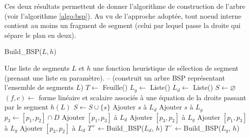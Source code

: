 Ces deux résultats permettent de donner l'algorithme de construction de
l'arbre (voir l'algorithme \ref{algo:bsp}). Au vu de l'approche adoptée,
tout noeud interne contient au moins un fragment de segment (celui
par lequel passe la droite qui sépare le plan en deux).

\begin{algorithm}
  \caption{Build\_BSP($L, h$)}
  \begin{algorithmic}[1] \label{algo:bsp}
    \REQUIRE Une liste de segments $L$ et $h$ une fonction
    heuristique de sélection de segment (prenant une liste en paramètre).
    \ENSURE -- (construit un arbre BSP représentant l'ensemble de segments $L$)
    \STATE $T\leftarrow$ Feuille()
    \STATE $L_g\leftarrow$ Liste()
    \STATE $L_d\leftarrow$ Liste()
    \STATE $S \leftarrow \varnothing$
    \STATE $\left(f, c\right)\leftarrow$ forme linéaire et scalaire
    associés à une équation de la droite passant par le segment $h(L)$
     \label{bsp:for}
    \STATE $S\leftarrow S\cup\{s\}$
    \STATE Ajouter $s$ à $L_d$
    \STATE Ajouter $s$ à $L_g$
    \ELSE
    \STATE $p_3\leftarrow [p_1, p_2]\cap D$
    \STATE Ajouter $[p_1, p_3]$ à $L_d$
    \STATE Ajouter $[p_3, p_2]$ à $L_g$
    \ELSE
    \STATE Ajouter $[p_1, p_3]$ à $L_g$
    \STATE Ajouter $[p_3, p_2]$ à $L_d$
    \ENDIF
    \ENDIF
    \ENDFOR
    \STATE $T^+\leftarrow$Build\_BSP($L_d$, $h$)
    \STATE $T^-\leftarrow$Build\_BSP($L_g$, $h$)
    \ENDIF
  \end{algorithmic}
\end{algorithm}

